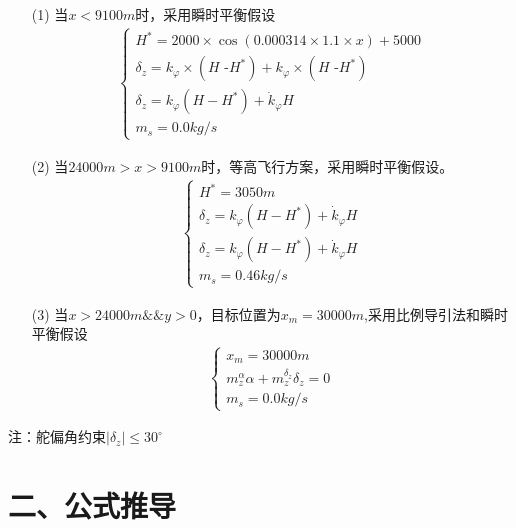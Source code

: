 \documentclass[UTF8]{ctexart}
\begin{document}
\begin{itemize}
    \item[(1)] 当$x<9100m$时，采用瞬时平衡假设
        \begin{align}
            \begin{cases}
                H^*=2000\times\cos(0.000314\times1.1\times x)+5000                     \\
                \delta_z=k_\varphi\times(H\text{ -}H^*)+k_\varphi\times(H\text{ -}H^*) \\
                \delta_z=k_\varphi(H-H^*)+\dot{k}_\varphi H                            \\
                m_{s}=0.0kg/s
            \end{cases}
        \end{align}
    \item[(2)] 当$24000m>x>9100m$时，等高飞行方案，采用瞬时平衡假设。
        \begin{align}
            \begin{cases}
                H^*=3050m                                   \\
                \delta_z=k_\varphi(H-H^*)+\dot{k}_\varphi H \\
                \delta_z=k_\varphi(H-H^*)+\dot{k}_\varphi H \\
                m_s=0.46kg/s
            \end{cases}
        \end{align}
    \item[(3)] 当$x>24000m\&\&y>0$，目标位置为$x_m=30000m$,采用比例导引法和瞬时平衡假设
        \begin{align}
            \begin{cases}
                x_m=30000 m                               \\
                m_z^\alpha\alpha+m_z^{\delta_z}\delta_z=0 \\
                m_s=0.0kg/s
            \end{cases}
        \end{align}
\end{itemize}

注：舵偏角约束$\left|\delta_{z} \right|\leq 30^{\circ}$




\section*{ 二、公式推导}


\end{document}
